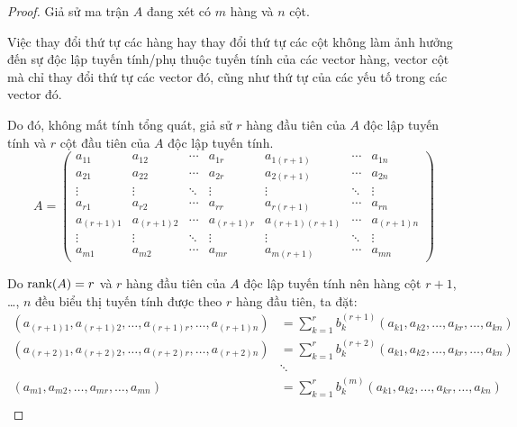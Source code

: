 \documentclass[class=nhvh-linear-algebra,crop=false]{standalone}
\begin{document}
\begin{proof}
	\par Giả sử ma trận $A$ đang xét có $m$ hàng và $n$ cột.
	\par Việc thay đổi thứ tự các hàng hay thay đổi thứ tự các cột không làm ảnh hưởng đến sự độc lập tuyến tính/phụ thuộc tuyến tính của các vector hàng, vector cột mà chỉ thay đổi thứ tự các vector đó, cũng như thứ tự của các yếu tố trong các vector đó.
	\par Do đó, không mất tính tổng quát, giả sử $r$ hàng đầu tiên của $A$ độc lập tuyến tính và $r$ cột đầu tiên của $A$ độc lập tuyến tính.
	\[
		A =
		\begin{pmatrix}
			a_{11}     & a_{12}     & \cdots & a_{1r}     & a_{1(r+1)}     & \cdots & a_{1n}     \\
			a_{21}     & a_{22}     & \cdots & a_{2r}     & a_{2(r+1)}     & \cdots & a_{2n}     \\
			\vdots     & \vdots     & \ddots & \vdots     & \vdots         & \ddots & \vdots     \\
			a_{r1}     & a_{r2}     & \cdots & a_{rr}     & a_{r(r+1)}     & \cdots & a_{rn}     \\
			a_{(r+1)1} & a_{(r+1)2} & \cdots & a_{(r+1)r} & a_{(r+1)(r+1)} & \cdots & a_{(r+1)n} \\
			\vdots     & \vdots     & \ddots & \vdots     & \vdots         & \ddots & \vdots     \\
			a_{m1}     & a_{m2}     & \cdots & a_{mr}     & a_{m(r+1)}     & \cdots & a_{mn}
		\end{pmatrix}
	\]
	\par Do $\text{rank}(A) = r$ và $r$ hàng đầu tiên của $A$ độc lập tuyến tính nên hàng cột $r+1$, \ldots, $n$ đều biểu thị tuyến tính được theo $r$ hàng đầu tiên, ta đặt:
	\begin{align*}
		(a_{(r+1)1}, a_{(r+1)2}, \ldots, a_{(r+1)r}, \ldots, a_{(r+1)n}) & = \sum^{r}_{k=1}b_{k}^{(r+1)}(a_{k1}, a_{k2}, \ldots, a_{kr}, \ldots, a_{kn}) \\
		(a_{(r+2)1}, a_{(r+2)2}, \ldots, a_{(r+2)r}, \ldots, a_{(r+2)n}) & = \sum^{r}_{k=1}b_{k}^{(r+2)}(a_{k1}, a_{k2}, \ldots, a_{kr}, \ldots, a_{kn}) \\
		                                                                 & \ddots                                                                        \\
		(a_{m1}, a_{m2}, \ldots, a_{mr}, \ldots, a_{mn})                 & = \sum^{r}_{k=1}b_{k}^{(m)}(a_{k1}, a_{k2}, \ldots, a_{kr}, \ldots, a_{kn})   \\

\end{align*}
\end{proof}
\end{document}
